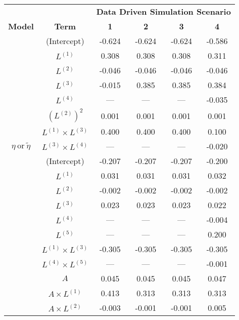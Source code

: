 \begin{sidewaystable}
\footnotesize
\begin{minipage}[t]{0.5\textwidth}
\centering

\begin{tabular}[t]{>{}ccccc>{}c}
\hline
\multicolumn{1}{c}{\textbf{ }} & \multicolumn{1}{c}{\textbf{ }} & \multicolumn{4}{c}{\textbf{Data Driven Simulation Scenario}} \\
\cmidrule{3-6}
\textbf{Model} & \textbf{Term} & \textbf{1} & \textbf{2} & \textbf{3} & \textbf{4}\\
\hline
 & (Intercept) & -0.624 & -0.624 & -0.624 & -0.586\\
\cmidrule{2-6}
 & $L^{(1)}$ & 0.308 & 0.308 & 0.308 & 0.311\\
\cmidrule{2-6}
 & $L^{(2)}$ & -0.046 & -0.046 & -0.046 & -0.046\\
\cmidrule{2-6}
 & $L^{(3)}$ & -0.015 & 0.385 & 0.385 & 0.384\\
\cmidrule{2-6}
 & $L^{(4)}$ & --- & --- & --- & -0.035\\
\cmidrule{2-6}
 & $(L^{(2)})^2$ & 0.001 & 0.001 & 0.001 & 0.001\\
\cmidrule{2-6}
 & $L^{(1)} \times L^{(3)}$ & 0.400 & 0.400 & 0.400 & 0.100\\
\cmidrule{2-6}
\multirow{-8}{*}{\centering\arraybackslash $\eta~\text{or}~\tilde\eta$} & $L^{(3)} \times L^{(4)}$ & --- & --- & --- & -0.020\\
\cmidrule{1-6}
 & (Intercept) & -0.207 & -0.207 & -0.207 & -0.200\\
\cmidrule{2-6}
 & $L^{(1)}$ & 0.031 & 0.031 & 0.031 & 0.032\\
\cmidrule{2-6}
 & $L^{(2)}$ & -0.002 & -0.002 & -0.002 & -0.002\\
\cmidrule{2-6}
 & $L^{(3)}$ & 0.023 & 0.023 & 0.023 & 0.022\\
\cmidrule{2-6}
 & $L^{(4)}$ & --- & --- & --- & -0.004\\
\cmidrule{2-6}
 & $L^{(5)}$ & --- & --- & --- & 0.200\\
\cmidrule{2-6}
 & $L^{(1)} \times L^{(3)}$ & -0.305 & -0.305 & -0.305 & -0.305\\
\cmidrule{2-6}
 & $L^{(4)} \times L^{(5)}$ & --- & --- & --- & -0.001\\
\cmidrule{2-6}
 & $A$ & 0.045 & 0.045 & 0.045 & 0.047\\
\cmidrule{2-6}
 & $A \times L^{(1)}$ & 0.413 & 0.313 & 0.313 & 0.313\\
\cmidrule{2-6}
 & $A \times L^{(2)}$ & -0.003 & -0.001 & -0.001 & 0.005\\

\end{tabular}
\end{minipage}
\end{sidewaystable}
